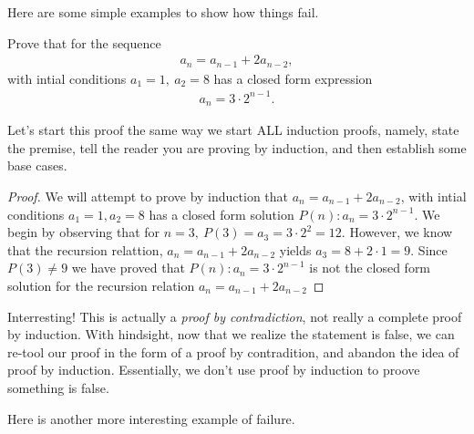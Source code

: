 \newpage
Here are some simple examples to show how things fail.
\begin{example}[$a_1 =1, a_2 = 8 \land a_n = a_{n-1} + 2a_{n-2}, ~\forall ~n>3$]
Prove that for the sequence
\begin{eqnarray}
 a_n = a_{n-1} + 2a_{n-2}, \label{exinduction03a}
 \end{eqnarray}
   with intial conditions $a_1 =1,  ~a_2 = 8$  has a closed form expression 
 \begin{eqnarray}
 a_n = 3\cdot 2^{n-1}. \label{exinduction03b}
 \end{eqnarray}
 
 Let's start this proof the same way we start ALL induction proofs, namely, state the premise, tell the reader you are proving by induction, and then establish some base cases. 
\begin{proof}
We will attempt to prove by induction that $a_n = a_{n-1} + 2a_{n-2}$, with intial conditions $a_1 =1, a_2 = 8$ has a closed form solution  $P(n): a_n = 3\cdot 2^{n-1}$.  We begin by observing that for $n=3,~ P(3) = a_3 = 3\cdot 2^2 = 12$.  However, we know that the recursion relattion, $a_n = a_{n-1} + 2a_{n-2}$ yields $a_3 =  8+2\cdot 1 = 9$.  Since $P(3)\neq 9$ we have proved that $P(n): a_n = 3\cdot 2^{n-1}$ is not the closed form solution for the recursion relation $a_n = a_{n-1} + 2a_{n-2}$
\end{proof}
Interresting!  This is actually a \emph{proof by contradiction}, not really a complete proof by induction.  With hindsight, now that we realize the statement is false, we can re-tool our proof in the form of a proof by contradition, and abandon the idea of proof by induction.  Essentially, we don't use proof by induction to proove something is false.  
\end{example}

Here is another more interesting example of failure.


